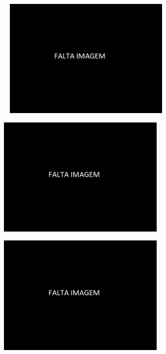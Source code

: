 \begin{figure}[htb]
    \centering
    \begin{subfigure}{.33\textwidth}\
        \centering
        \includegraphics[width = 0.9\textwidth]{Figures/Cap3/Falta_Imagem.png}
        \caption{}
        \label{fig:Prato}
    \end{subfigure}%
    \centering
    \begin{subfigure}{.33\textwidth}
        \centering
        \includegraphics[width = 0.9\textwidth]{Figures/Cap3/Falta_Imagem.png}
        \caption{}
        \label{fig:Torre}
    \end{subfigure}
    \centering
    \begin{subfigure}{.33\textwidth}
        \centering
        \includegraphics[width = 0.9\textwidth]{Figures/Cap3/Falta_Imagem.png}

\end{subfigure}
\end{figure}
